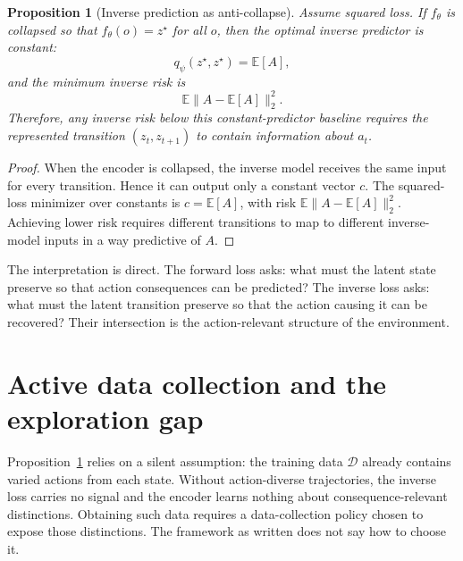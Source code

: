 \documentclass[11pt]{article}
\newtheorem{proposition}{Proposition}
\theoremstyle{remark}
\newcommand{\E}{\mathbb E}
\newcommand{\1}{\mathbb 1}
\begin{document}
\begin{proposition}[Inverse prediction as anti-collapse]
\label{prop:anti-collapse}
Assume squared loss. If $f_\theta$ is collapsed so that $f_\theta(o)=z^\star$ for all $o$, then the optimal inverse predictor is constant:
\begin{equation}
    q_\psi(z^\star,z^\star)=\E[A],
\end{equation}
and the minimum inverse risk is
\begin{equation}
    \E\|A-\E[A]\|_2^2.
\end{equation}
Therefore, any inverse risk below this constant-predictor baseline requires the represented transition $(z_t,z_{t+1})$ to contain information about $a_t$.
\end{proposition}

\begin{proof}
When the encoder is collapsed, the inverse model receives the same input for every transition. Hence it can output only a constant vector $c$. The squared-loss minimizer over constants is $c=\E[A]$, with risk $\E\|A-\E[A]\|_2^2$. Achieving lower risk requires different transitions to map to different inverse-model inputs in a way predictive of $A$.
\end{proof}

The interpretation is direct. The forward loss asks: what must the latent state preserve so that action consequences can be predicted? The inverse loss asks: what must the latent transition preserve so that the action causing it can be recovered? Their intersection is the action-relevant structure of the environment.

\section{Active data collection and the exploration gap}
\label{sec:exploration}

Proposition~\ref{prop:anti-collapse} relies on a silent assumption: the training data $\mathcal{D}$ already contains varied actions from each state. Without action-diverse trajectories, the inverse loss carries no signal and the encoder learns nothing about consequence-relevant distinctions. Obtaining such data requires a data-collection policy chosen to expose those distinctions. The framework as written does not say how to choose it.
\end{document}

